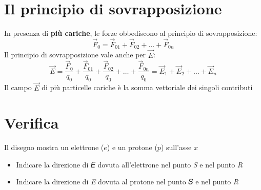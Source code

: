 \documentclass{book}
\begin{document}
\section{Il principio di sovrapposizione}
In presenza di \textbf{più cariche}, le forze obbediscono al principio di sovrapposizione:
\begin{equation}
  \vec{F}_0=\vec{F}_{01}+\vec{F}_{02}+\dots+\vec{F}_{0n}
\end{equation}
Il principio di sovrapposizione vale anche per $\vec{E}$:
\begin{equation}
  \vec{E}=\frac{\vec{F}_0}{q_0}+\frac{\vec{F}_{01}}{q_0}+\frac{\vec{F}_{02}}{q_0}+\dots+\frac{\vec{F}_{0n}}{q_0}=\vec{E}_1+\vec{E}_2+\dots+\vec{E}_n
\end{equation}
Il campo $\vec{E}$ di più particelle cariche è la somma vettoriale dei singoli contributi
\section{Verifica}
\begin{center}
\end{center}
Il disegno mostra un elettrone ($e$) e un protone ($p$) sull'asse $x$
\begin{itemize}
	\item Indicare la direzione di 𝐸 dovuta all’elettrone nel
          punto \textit{S} e nel punto \textit{R}
        \item Indicare la direzione di \textit{E} dovuta al protone nel
punto 𝑆 e nel punto \textit{R}
\end{itemize}
\end{document}
